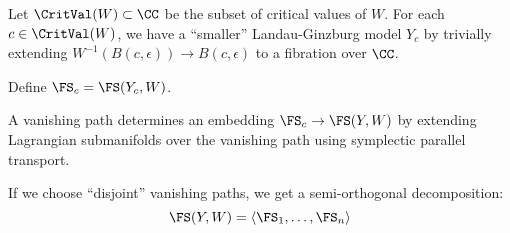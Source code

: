 

Let $\CritVal(W) \subset \CC$ be the subset of critical values of $W$. For each $c \in \CritVal(W)$, we have a ``smaller'' Landau-Ginzburg model $Y_c$ by trivially extending $W^{-1}(B(c, \epsilon)) \to B(c, \epsilon)$ to a fibration over $\CC$. 

Define $\FS_c = \FS(Y_c, W)$. 

A vanishing path determines an embedding $\FS_c \to \FS(Y, W)$ by extending Lagrangian submanifolds over the vanishing path using symplectic parallel transport. 

If we choose ``disjoint'' vanishing paths, we get a semi-orthogonal decomposition:
\[\FS(Y, W) = \langle \FS_1, \ldots, \FS_n\rangle \]




